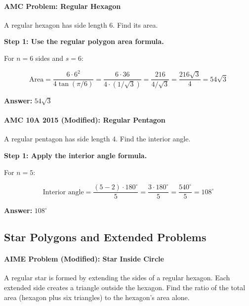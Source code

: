 ﻿\documentclass[12pt]{extarticle}
\begin{document}
\paragraph{AMC Problem: Regular Hexagon}

A regular hexagon has side length 6. Find its area.

\begin{solutionbox}
\textbf{Step 1: Use the regular polygon area formula.}

For $n = 6$ sides and $s = 6$:

\[\text{Area} = \frac{6 \cdot 6^2}{4\tan(\pi/6)} = \frac{6 \cdot 36}{4 \cdot (1/\sqrt{3})} = \frac{216}{4/\sqrt{3}} = \frac{216\sqrt{3}}{4} = 54\sqrt{3}\]

\textbf{Answer:} $\boxed{54\sqrt{3}}$
\end{solutionbox}

\paragraph{AMC 10A 2015 (Modified): Regular Pentagon}

A regular pentagon has side length 4. Find the interior angle.

\begin{solutionbox}
\textbf{Step 1: Apply the interior angle formula.}

For $n = 5$:

\[\text{Interior angle} = \frac{(5-2) \cdot 180^{\circ}}{5} = \frac{3 \cdot 180^{\circ}}{5} = \frac{540^{\circ}}{5} = 108^{\circ}\]

\textbf{Answer:} $\boxed{108^{\circ}}$
\end{solutionbox}

\subsection{Star Polygons and Extended Problems}

\paragraph{AIME Problem (Modified): Star Inside Circle}

A regular star is formed by extending the sides of a regular hexagon. Each extended side creates a triangle outside the hexagon. Find the ratio of the total area (hexagon plus six triangles) to the hexagon's area alone.
\end{document}
